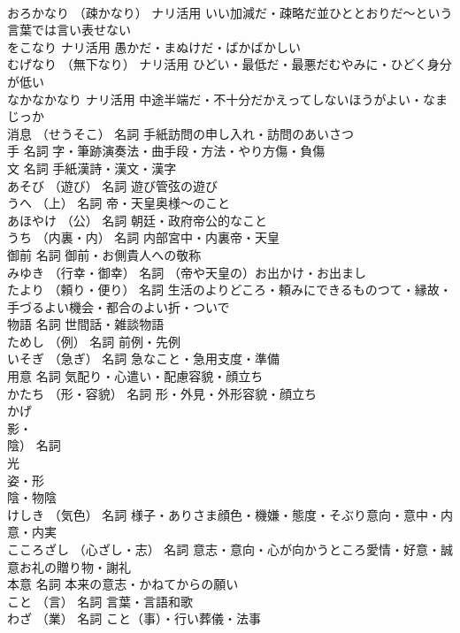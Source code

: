 \documentclass[8pt]{extreport}
\begin{document}
\begin{CJK}{UTF8}{min}
\\	おろかなり	（疎かなり）	ナリ活用	いい加減だ・疎略だ並ひととおりだ～という言葉では言い表せない
\\	をこなり		ナリ活用	愚かだ・まぬけだ・ばかばかしい
\\	むげなり	（無下なり）	ナリ活用	ひどい・最低だ・最悪だむやみに・ひどく身分が低い
\\	なかなかなり		ナリ活用	中途半端だ・不十分だかえってしないほうがよい・なまじっか
\\	消息	（せうそこ）	名詞	手紙訪問の申し入れ・訪問のあいさつ
\\	手		名詞	字・筆跡演奏法・曲手段・方法・やり方傷・負傷
\\	文		名詞	手紙漢詩・漢文・漢字
\\	あそび	（遊び）	名詞	遊び管弦の遊び
\\	うへ	（上）	名詞	帝・天皇奥様～のこと
\\	あほやけ	（公）	名詞	朝廷・政府帝公的なこと
\\	うち	（内裏・内）	名詞	内部宮中・内裏帝・天皇
\\	御前		名詞	御前・お側貴人への敬称
\\	みゆき	（行幸・御幸）	名詞	（帝や天皇の）お出かけ・お出まし
\\	たより	（頼り・便り）	名詞	生活のよりどころ・頼みにできるものつて・縁故・手づるよい機会・都合のよい折・ついで
\\	物語		名詞	世間話・雑談物語
\\	ためし	（例）	名詞	前例・先例
\\	いそぎ	（急ぎ）	名詞	急なこと・急用支度・準備
\\	用意		名詞	気配り・心遣い・配慮容貌・顔立ち
\\	かたち	（形・容貌）	名詞	形・外見・外形容貌・顔立ち
\\	かげ	
\\	影・
\\	陰）	名詞	
\\	光
\\	姿・形
\\	陰・物陰
\\	けしき	（気色）	名詞	様子・ありさま顔色・機嫌・態度・そぶり意向・意中・内意・内実
\\	こころざし	（心ざし・志）	名詞	意志・意向・心が向かうところ愛情・好意・誠意お礼の贈り物・謝礼
\\	本意		名詞	本来の意志・かねてからの願い
\\	こと	（言）	名詞	言葉・言語和歌
\\	わざ	（業）	名詞	こと（事）・行い葬儀・法事

\end{CJK}
\end{document}

